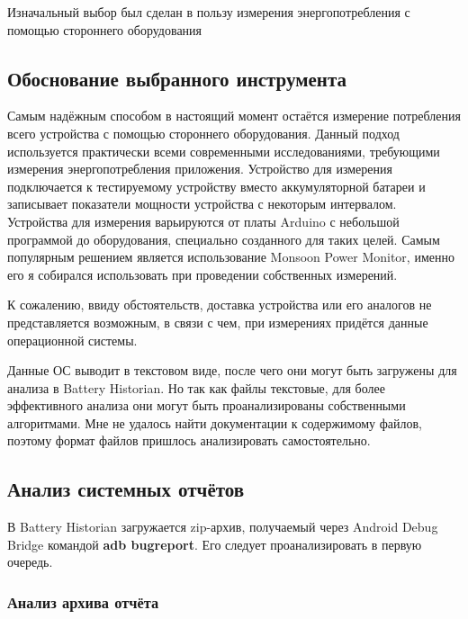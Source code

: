 \documentclass[a4paper,14pt]{extarticle} %
\begin{document}
	Изначальный выбор был сделан в пользу измерения энергопотребления с помощью стороннего оборудования
	
	\subsection{Обоснование выбранного инструмента}
	
	Самым надёжным способом в настоящий момент остаётся измерение потребления всего устройства с помощью стороннего оборудования. Данный подход используется практически всеми современными исследованиями, требующими измерения энергопотребления приложения. Устройство для измерения подключается к тестируемому устройству вместо аккумуляторной батареи и записывает показатели мощности устройства с некоторым интервалом. Устройства для измерения варьируются от платы Arduino с небольшой программой до оборудования, специально созданного для таких целей. Самым популярным решением является использование Monsoon Power Monitor, именно его я собирался использовать при проведении собственных измерений. 
	
	К сожалению, ввиду обстоятельств, доставка устройства или его аналогов не представляется возможным, в связи с чем, при измерениях придётся данные операционной системы. 
	
	Данные ОС выводит в текстовом виде, после чего они могут быть загружены для анализа в Battery Historian. Но так как файлы текстовые, для более эффективного анализа они могут быть проанализированы собственными алгоритмами. Мне не удалось найти документации к содержимому файлов, поэтому формат файлов пришлось анализировать самостоятельно.
	
	\subsection{Анализ системных отчётов}
	
	В Battery Historian загружается zip-архив, получаемый через Android Debug Bridge командой \textbf{adb bugreport}. Его следует проанализировать в первую очередь.
	
	\subsubsection{Анализ архива отчёта}
	
\end{document}
